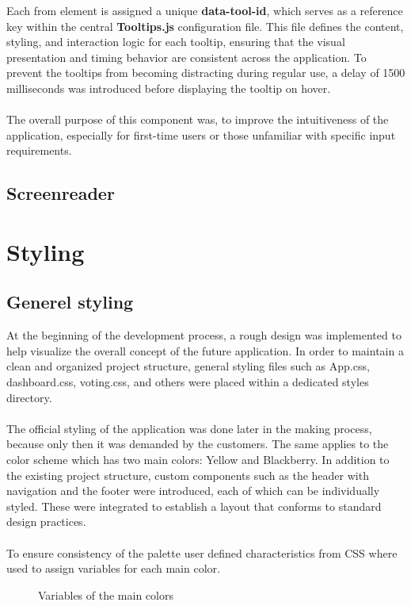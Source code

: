 \documentclass[a4paper,12pt]{report}
\begin{document}
Each from element is assigned a unique \textbf{data-tool-id}, which serves as a reference key within the central \textbf{Tooltips.js} configuration file. This file defines the content, styling, and interaction logic for each tooltip, ensuring that the visual presentation and timing behavior are consistent across the application. To prevent the tooltips from becoming distracting during regular use, a delay of 1500 milliseconds was introduced before displaying the tooltip on hover.\\\\


The overall purpose of this component was, to improve the intuitiveness of the application, especially for first-time users or those unfamiliar with specific input requirements.
\subsection{Screenreader}
\section{Styling}
\subsection{Generel styling}
At the beginning of the development process, a rough design was implemented to help visualize the overall concept of the future application. In order to maintain a clean and organized project structure, general styling files such as App.css, dashboard.css, voting.css, and others were placed within a dedicated styles directory.\\\\
The official styling of the application was done later in the making process, because only then it was demanded by the customers. The same applies to the color scheme which has two main colors: Yellow and Blackberry. In addition to the existing project structure, custom components such as the header with navigation and the footer were introduced, each of which can be individually styled. These were integrated to establish a layout that conforms to standard design practices.\\\\
To ensure consistency of the palette user defined characteristics from CSS where used to assign variables for each main color. \parencite{csscolorvariables}
\begin{figure}[h!]
	\caption{Variables of the main colors}
	\label{fig:user_defined_characteristics}
\end{figure}
\end{document}
